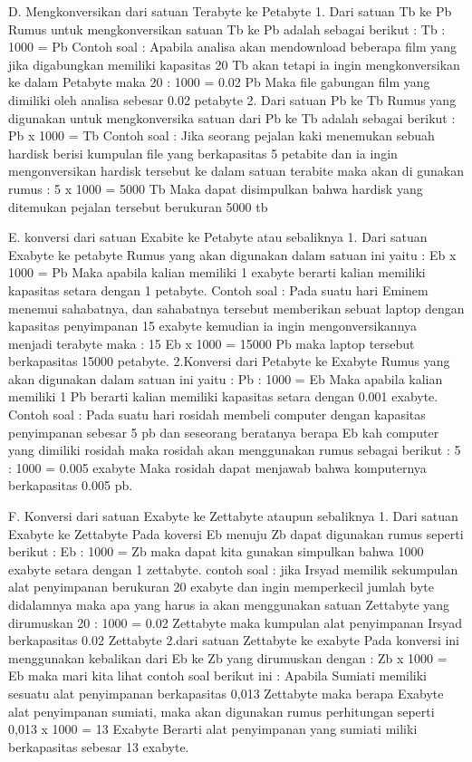 D. Mengkonversikan dari satuan Terabyte ke Petabyte
1.	Dari satuan Tb ke Pb
Rumus untuk mengkonversikan satuan Tb ke Pb adalah sebagai berikut :
Tb : 1000 = Pb
Contoh soal :
Apabila analisa akan mendownload beberapa film yang jika digabungkan memiliki kapasitas 20 Tb akan tetapi ia ingin mengkonversikan ke dalam Petabyte maka 
20 : 1000 = 0.02 Pb
Maka file gabungan film yang dimiliki oleh analisa sebesar 0.02 petabyte
2. Dari satuan Pb ke Tb
Rumus yang digunakan untuk mengkonversika satuan dari Pb ke Tb adalah sebagai berikut :
Pb x 1000 = Tb
Contoh soal :
Jika seorang pejalan kaki menemukan sebuah hardisk berisi kumpulan file yang berkapasitas 5 petabite dan ia ingin mengonversikan hardisk tersebut ke dalam satuan terabite maka akan di gunakan rumus :
5 x 1000 = 5000 Tb
Maka dapat disimpulkan bahwa hardisk yang ditemukan pejalan tersebut berukuran 5000 tb

E. konversi dari satuan Exabite ke Petabyte atau sebaliknya
1. Dari satuan Exabyte ke petabyte
Rumus yang akan digunakan dalam satuan ini yaitu :
Eb x 1000 = Pb
Maka apabila kalian memiliki 1 exabyte berarti kalian memiliki kapasitas setara dengan 1 petabyte.
Contoh soal :
Pada suatu hari Eminem menemui sahabatnya, dan sahabatnya tersebut memberikan sebuat laptop dengan kapasitas penyimpanan 15 exabyte kemudian ia ingin mengonversikannya menjadi terabyte maka :
15 Eb x 1000 = 15000 Pb maka laptop tersebut berkapasitas 15000 petabyte.
2.Konversi dari Petabyte ke Exabyte
Rumus yang akan digunakan dalam satuan ini yaitu :
Pb : 1000 = Eb
Maka apabila kalian memiliki 1 Pb berarti kalian memiliki kapasitas setara dengan 0.001 exabyte.
Contoh soal :
Pada suatu hari rosidah membeli computer dengan kapasitas penyimpanan sebesar 5 pb dan seseorang beratanya berapa Eb kah computer yang dimiliki rosidah maka rosidah akan menggunakan rumus sebagai berikut :
5 : 1000 = 0.005 exabyte
Maka rosidah dapat menjawab bahwa komputernya berkapasitas 0.005 pb.

F. Konversi dari satuan Exabyte ke Zettabyte ataupun sebaliknya
1. Dari satuan Exabyte ke Zettabyte
Pada koversi Eb menuju Zb dapat digunakan rumus seperti berikut :
Eb : 1000 = Zb
maka dapat kita gunakan simpulkan bahwa 1000 exabyte setara dengan 1 zettabyte.
contoh soal :
jika Irsyad memilik sekumpulan alat penyimpanan berukuran 20 exabyte dan ingin memperkecil jumlah byte didalamnya maka apa yang harus ia akan menggunakan satuan Zettabyte yang dirumuskan
20 : 1000 = 0.02 Zettabyte
maka kumpulan alat penyimpanan Irsyad berkapasitas 0.02 Zettabyte
2.dari satuan Zettabyte ke exabyte
Pada konversi ini menggunakan kebalikan dari Eb ke Zb yang dirumuskan dengan :
Zb x 1000 = Eb
maka mari kita lihat contoh soal berikut ini :
Apabila Sumiati memiliki sesuatu alat penyimpanan berkapasitas 0,013 Zettabyte maka berapa Exabyte alat penyimpanan sumiati, maka akan digunakan rumus perhitungan seperti
0,013 x 1000 = 13 Exabyte
Berarti alat penyimpanan yang sumiati miliki berkapasitas sebesar 13 exabyte.


